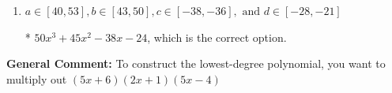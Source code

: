 \documentclass{extbook}[14pt]
\begin{document}
\begin{enumerate}
{\begin{enumerate}[label=\Alph*.]
$50x^{3} -45 x^{2} -38 x + 24$, which corresponds to multiplying out $(5x -6)(2x -1)(5x + 4)$.
\item \( a \in [40, 53], b \in [43, 50], c \in [-38, -36], \text{ and } d \in [-28, -21] \)

* $50x^{3} +45 x^{2} -38 x -24$, which is the correct option.
\end{enumerate}

\textbf{General Comment:} To construct the lowest-degree polynomial, you want to multiply out $(5x + 6)(2x + 1)(5x -4)$
}
\end{enumerate}
\end{document}
